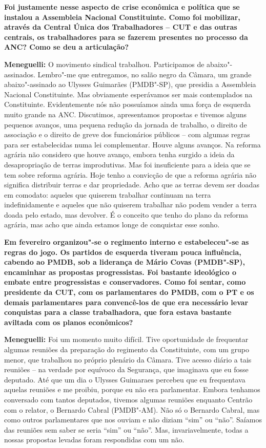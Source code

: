\textbf{Foi justamente nesse aspecto de crise econômica e política que
se instalou a Assembleia Nacional Constituinte. Como foi mobilizar,
através da Central Única dos Trabalhadores -- CUT e das outras centrais,
os trabalhadores para se fazerem presentes no processo da ANC? Como se
deu a articulação?}

\textbf{Meneguelli:} O movimento sindical trabalhou. Participamos de
abaixo"-assinados. Lembro"-me que entregamos, no salão negro da Câmara, um
grande abaixo"-assinado ao Ulysses Guimarães (PMDB"-SP), que presidia a
Assembleia Nacional Constituinte. Mas obviamente esperávamos ser mais
contemplados na Constituinte. Evidentemente nós não possuíamos ainda uma
força de esquerda muito grande na ANC. Discutimos, apresentamos
propostas e tivemos alguns pequenos avanços, uma pequena redução da
jornada de trabalho, o direito de associação e o direito de greve dos
funcionários públicos -- com algumas regras para ser estabelecidas numa
lei complementar. Houve alguns avanços. Na reforma agrária não considero
que houve avanço, embora tenha surgido a ideia da desapropriação de
terras improdutivas. Mas foi insuficiente para a ideia que se tem sobre
reforma agrária. Hoje tenho a convicção de que a reforma agrária não
significa distribuir terras e dar propriedade. Acho que as terras devem
ser doadas em comodato: aqueles que quiserem trabalhar continuam na
terra indefinidamente e aqueles que não quiserem trabalhar não podem
vender a terra doada pelo estado, mas devolver. É o conceito que tenho
do plano da reforma agrária, mas acho que ainda estamos longe de
conquistar esse sonho.

\textbf{Em fevereiro organizou"-se o regimento interno e estabeleceu"-se
as regras do jogo. Os partidos de esquerda tiveram pouca influência,
cabendo ao PMDB, sob a liderança de Mário Covas (PMDB"-SP), encaminhar as
propostas progressistas. Foi bastante ideológico o embate entre
progressistas e conservadores. Como foi sentar, como presidente da CUT,
com os parlamentares do PMDB, com o PT e os demais parlamentares para
convencê-los de que era necessário levar conquistas para a classe
trabalhadora, que fora estava bastante aviltada com os planos
econômicos?}

\textbf{Meneguelli:} Foi um momento muito difícil. Tive oportunidade de
frequentar algumas reuniões da preparação do regimento da Constituinte,
com um grupo menor, que trabalhou no próprio plenário da Câmara. Tive
acesso diário a tais reuniões -- na verdade por equívoco da Segurança,
que imaginava que eu fosse deputado. Até que um dia o Ulysses Guimaraes
percebeu que eu frequentava aquelas reuniões e me proibiu, porque eu não
era parlamentar. Embora tenhamos conversado com tantos deputados,
tivemos algumas reuniões enquanto Centrão com o relator, o Bernardo
Cabral (PMDB"-AM). Não só o Bernardo Cabral, mas como outros
parlamentares que nos ouviam e não diziam ``sim'' ou ``não''. Saíamos
das reuniões sem saber se seria ``sim'' ou ``não''. Mas,
invariavelmente, todas a nossas propostas levadas foram respondidas com
um não.

